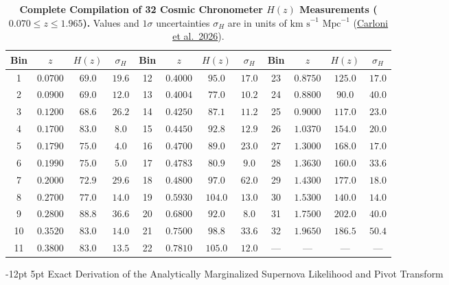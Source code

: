 \documentclass[11pt,letterpaper]{article}
\makeatletter
\renewcommand{\subsection}{\@startsection{subsection}{2}{\z@}%
  {-12pt \@plus -3pt \@minus -1pt}%
  {5pt \@plus 1pt}%
  {\normalfont\large\bfseries\color{tealaccent}}}
\renewcommand{\arraystretch}{1.20}
\makeatother
\begin{document}
\begin{table}[!htbp]
\centering
\caption{\textbf{Complete Compilation of 32 Cosmic Chronometer $H(z)$ Measurements ($0.070 \le z \le 1.965$).} Values and $1\sigma$ uncertainties $\sigma_H$ are in units of $\text{km s}^{-1}\text{ Mpc}^{-1}$ (\href{https://arxiv.org/pdf/2608.01215}{Carloni et al.\ 2026}).}
\label{tab:cc_full_32}
\vspace{3pt}
\footnotesize
\setlength{\tabcolsep}{5.5pt}
\renewcommand{\arraystretch}{1.12}
\begin{tabular}{cccc|cccc|cccc}
\toprule\rowcolor{tableheadbg}
\textbf{Bin} & $z$ & $H(z)$ & $\sigma_H$ & \textbf{Bin} & $z$ & $H(z)$ & $\sigma_H$ & \textbf{Bin} & $z$ & $H(z)$ & $\sigma_H$ \\
\midrule
1  & $0.0700$ & $69.0$ & $19.6$ & 12 & $0.4000$ & $95.0$  & $17.0$ & 23 & $0.8750$ & $125.0$ & $17.0$ \\
2  & $0.0900$ & $69.0$ & $12.0$ & 13 & $0.4004$ & $77.0$  & $10.2$ & 24 & $0.8800$ & $90.0$  & $40.0$ \\
3  & $0.1200$ & $68.6$ & $26.2$ & 14 & $0.4250$ & $87.1$  & $11.2$ & 25 & $0.9000$ & $117.0$ & $23.0$ \\
4  & $0.1700$ & $83.0$ & $8.0$  & 15 & $0.4450$ & $92.8$  & $12.9$ & 26 & $1.0370$ & $154.0$ & $20.0$ \\
5  & $0.1790$ & $75.0$ & $4.0$  & 16 & $0.4700$ & $89.0$  & $23.0$ & 27 & $1.3000$ & $168.0$ & $17.0$ \\
6  & $0.1990$ & $75.0$ & $5.0$  & 17 & $0.4783$ & $80.9$  & $9.0$  & 28 & $1.3630$ & $160.0$ & $33.6$ \\
7  & $0.2000$ & $72.9$ & $29.6$ & 18 & $0.4800$ & $97.0$  & $62.0$ & 29 & $1.4300$ & $177.0$ & $18.0$ \\
8  & $0.2700$ & $77.0$ & $14.0$ & 19 & $0.5930$ & $104.0$ & $13.0$ & 30 & $1.5300$ & $140.0$ & $14.0$ \\
9  & $0.2800$ & $88.8$ & $36.6$ & 20 & $0.6800$ & $92.0$  & $8.0$  & 31 & $1.7500$ & $202.0$ & $40.0$ \\
10 & $0.3520$ & $83.0$ & $14.0$ & 21 & $0.7500$ & $98.8$  & $33.6$ & 32 & $1.9650$ & $186.5$ & $50.4$ \\
11 & $0.3800$ & $83.0$ & $13.5$ & 22 & $0.7810$ & $105.0$ & $12.0$ & --- & --- & --- & --- \\
\bottomrule
\end{tabular}
\end{table}

\subsection{Exact Derivation of the Analytically Marginalized Supernova Likelihood and Pivot Transform}
\end{document}
